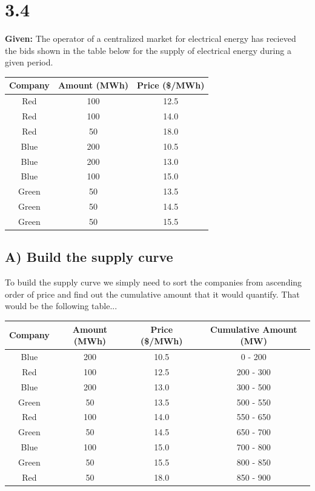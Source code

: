 \documentclass{article}
\begin{document}
\section{3.4}
\textbf{Given:} The operator of a centralized market for electrical energy has recieved the bids shown in the table below for the supply of electrical energy during a given period.
\begin{center}
	\begin{tabular}{|c|c|c|}
		\hline
		\textbf{Company} & \textbf{Amount (MWh)} & \textbf{Price (\$/MWh)} \\
		\hline
		Red & 100 & 12.5 \\
		Red & 100 & 14.0 \\
		Red & 50 & 18.0 \\
		Blue & 200 & 10.5 \\
		Blue & 200 & 13.0 \\
		Blue & 100 & 15.0 \\
		Green & 50 & 13.5 \\
		Green & 50 & 14.5 \\
		Green & 50 & 15.5 \\
		\hline
	\end{tabular}
\end{center}

\subsection{A) Build the supply curve}
To build the supply curve we simply need to sort the companies from ascending order of price and find out the cumulative amount that it would quantify. That would be the following table...
\begin{center}
	\begin{tabular}{|c|c|c|c|}
		\hline
		\textbf{Company} & \textbf{Amount (MWh)} & \textbf{Price (\$/MWh)} & \textbf{Cumulative Amount (MW)} \\
		\hline
		Blue & 200 & 10.5 & 0 - 200 \\
		Red & 100 & 12.5 & 200 - 300 \\
		Blue & 200 & 13.0 & 300 - 500 \\
		Green & 50 & 13.5 & 500 - 550 \\
		Red & 100 & 14.0 & 550 - 650 \\
		Green & 50 & 14.5 & 650 - 700 \\
		Blue & 100 & 15.0 & 700 - 800 \\
		Green & 50 & 15.5 & 800 - 850 \\
		Red & 50 & 18.0 & 850 - 900 \\
		\hline
	\end{tabular}
\end{center}
\end{document}
